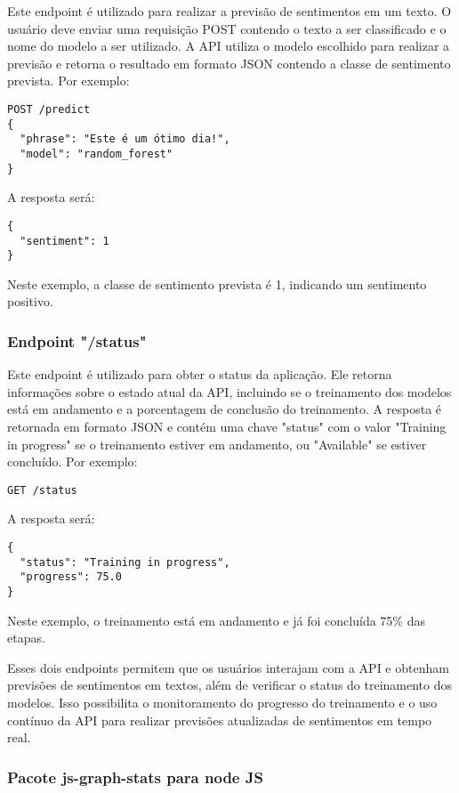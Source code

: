 Este endpoint é utilizado para realizar a previsão de sentimentos em um texto. O usuário deve enviar uma requisição POST contendo o texto a ser classificado e o nome do modelo a ser utilizado. A API utiliza o modelo escolhido para realizar a previsão e retorna o resultado em formato JSON contendo a classe de sentimento prevista. Por exemplo:

\begin{verbatim}
POST /predict
{
  "phrase": "Este é um ótimo dia!",
  "model": "random_forest"
}
\end{verbatim}

A resposta será:

\begin{verbatim}
{
  "sentiment": 1
}
\end{verbatim}

Neste exemplo, a classe de sentimento prevista é 1, indicando um sentimento positivo.

\subsubsection*{Endpoint "/status"}

Este endpoint é utilizado para obter o status da aplicação. Ele retorna informações sobre o estado atual da API, incluindo se o treinamento dos modelos está em andamento e a porcentagem de conclusão do treinamento. A resposta é retornada em formato JSON e contém uma chave "status" com o valor "Training in progress" se o treinamento estiver em andamento, ou "Available" se estiver concluído. Por exemplo:

\begin{verbatim}
GET /status
\end{verbatim}

A resposta será:

\begin{verbatim}
{
  "status": "Training in progress",
  "progress": 75.0
}
\end{verbatim}

Neste exemplo, o treinamento está em andamento e já foi concluída 75\% das etapas.

Esses dois endpoints permitem que os usuários interajam com a API e obtenham previsões de sentimentos em textos, além de verificar o status do treinamento dos modelos. Isso possibilita o monitoramento do progresso do treinamento e o uso contínuo da API para realizar previsões atualizadas de sentimentos em tempo real.

\subsubsection{Pacote js-graph-stats para node JS}
\lipsum[5]

